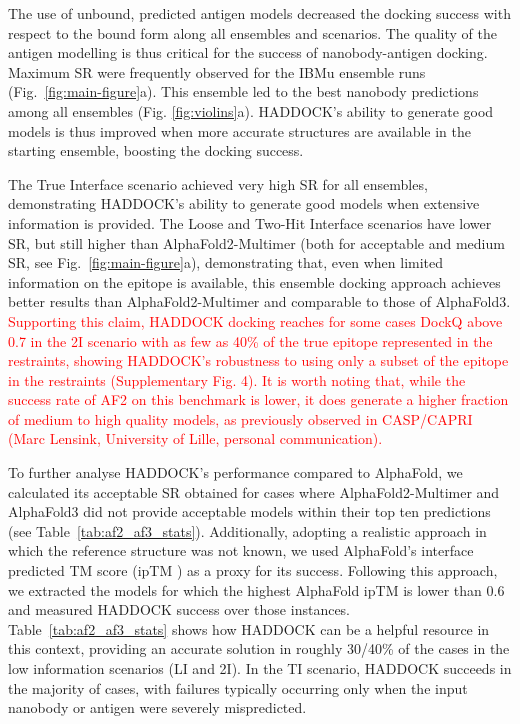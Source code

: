 \documentclass[12pt]{article}
\begin{document}
The use of unbound, predicted antigen models decreased the docking success with respect to the bound form along all ensembles and scenarios. The quality of the antigen modelling is thus critical for the success of nanobody-antigen docking. Maximum SR were frequently observed for the IBMu ensemble runs (Fig.~\ref{fig:main-figure}a). This ensemble led to the best nanobody predictions among all ensembles (Fig. \ref{fig:violins}a). HADDOCK’s ability to generate good models is thus improved when more accurate structures are available in the starting ensemble, boosting the docking success.

The True Interface scenario achieved very high SR for all ensembles, demonstrating HADDOCK’s ability to generate good models when extensive information is provided. The Loose and Two-Hit Interface scenarios have lower SR, but still higher than AlphaFold2-Multimer (both for acceptable and medium SR, see Fig.~\ref{fig:main-figure}a), demonstrating that, even when limited information on the epitope is available, this ensemble docking approach achieves better results than AlphaFold2-Multimer and comparable to those of AlphaFold3. \textcolor{Red}{Supporting this claim, HADDOCK docking reaches for some cases DockQ above 0.7 in the 2I scenario with as few as 40\% of the true epitope represented in the restraints, showing HADDOCK's robustness to using only a subset of the epitope in the restraints (Supplementary Fig. 4). It is worth noting that, while the success rate of AF2 on this benchmark is lower, it does generate a higher fraction of medium to high quality models, as previously observed  in CASP/CAPRI (Marc Lensink, University of Lille, personal communication).}

To further analyse HADDOCK's performance compared to AlphaFold, we calculated its acceptable SR obtained for cases where AlphaFold2-Multimer and AlphaFold3 did not provide acceptable models within their top ten predictions (see Table~\ref{tab:af2_af3_stats}). Additionally, adopting a realistic approach in which the reference structure was not known, we used AlphaFold's interface predicted TM score (ipTM \cite{evans2021protein, abramson2024accurate}) as a proxy for its success. Following this approach, we extracted the models for which the highest AlphaFold ipTM is lower than $0.6$ and measured HADDOCK success over those instances. Table~\ref{tab:af2_af3_stats} shows how HADDOCK can be a helpful resource in this context, providing an accurate solution in roughly 30/40\% of the cases in the low information scenarios (LI and 2I). In the TI scenario, HADDOCK succeeds in the majority of cases, with failures typically occurring only when the input nanobody or antigen were severely mispredicted.
\end{document}
